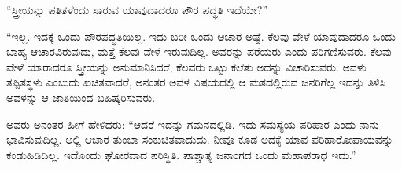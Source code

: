 \vskip 3pt

“ಸ್ತ್ರೀಯನ್ನು ಪತಿತಳೆಂದು ಸಾರುವ ಯಾವುದಾದರೂ ಪೌರ ಪದ್ಧತಿ ಇದೆಯೇ?”

\vskip 3pt

“ಇಲ್ಲ. ಇದಕ್ಕೆ ಒಂದು ಪೌರಪದ್ಧತಿಯಿಲ್ಲ. ಇದು ಬರೀ ಒಂದು ಆಚಾರ ಅಷ್ಟೆ. ಕೆಲವು ವೇಳೆ ಯಾವುದಾದರೂ ಒಂದು ಬಾಹ್ಯ ಆಚಾರವಿರುವುದು, ಮತ್ತೆ ಕೆಲವು ವೇಳೆ ಇರುವುದಿಲ್ಲ. ಅವರನ್ನು ಪರೆಯರು ಎಂದು ಪರಿಗಣಿಸುವರು. ಕೆಲವು ವೇಳೆ ಯಾರಾದರೂ ಸ್ತ್ರೀಯನ್ನು ಅನುಮಾನಿಸಿದರೆ, ಕೆಲವರು ಒಟ್ಟು ಕಲೆತು ಅದನ್ನು ವಿಚಾರಿಸುವರು. ಅವಳು ತಪ್ಪಿತಸ್ಥಳು ಎಂಬುದು ಖಚಿತವಾದರೆ, ಅನಂತರ ಅವಳ ವಿಷಯದಲ್ಲಿ ಆ ಮತದಲ್ಲಿರುವ ಜನರಿಗೆಲ್ಲ ಇದನ್ನು ತಿಳಿಸಿ ಅವಳನ್ನು ಆ ಜಾತಿಯಿಂದ ಬಹಿಷ್ಕರಿಸುವರು.

ಅವರು ಅನಂತರ ಹೀಗೆ ಹೇಳಿದರು: “ಆದರೆ ಇದನ್ನು ಗಮನದಲ್ಲಿಡಿ. ಇದು ಸಮಸ್ಯೆಯ ಪರಿಹಾರ ಎಂದು ನಾನು ಭಾವಿಸುವುದಿಲ್ಲ. ಅಲ್ಲಿ ಆಚಾರ ತುಂಬಾ ಸಂಕುಚಿತವಾದುದು. ನೀವೂ ಕೂಡ ಅದಕ್ಕೆ ಯಾವ ಪರಿಹಾರೋಪಾಯವನ್ನು ಕಂಡುಹಿಡಿದಿಲ್ಲ. ಇದೊಂದು ಘೋರವಾದ ಪರಿಸ್ಥಿತಿ. ಪಾಶ್ಚಾತ್ಯ ಜನಾಂಗದ ಒಂದು ಮಹಾಪರಾಧ ಇದು.”

